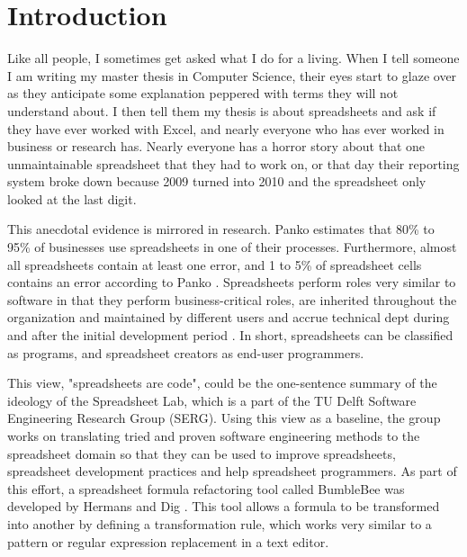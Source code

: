 \documentclass[12pt,a4paper,onecolumn,oneside,parskip]{memoir}
\begin{document}


\cleardoublepage

\tableofcontents*

\clearpage


\chapter{Introduction}

Like all people, I sometimes get asked what I do for a living.
When I tell someone I am writing my master thesis in Computer Science, their eyes start to glaze over as they anticipate some explanation peppered with terms they will not understand about.
I then tell them my thesis is about spreadsheets and ask if they have ever worked with Excel, and nearly everyone who has ever worked in business or research has.
Nearly everyone has a horror story about that one unmaintainable spreadsheet that they had to work on, or that day their reporting system broke down because 2009 turned into 2010 and the spreadsheet only looked at the last digit.

This anecdotal evidence is mirrored in research.
Panko \cite{panko2006facing} estimates that 80\% to 95\% of businesses use spreadsheets in one of their processes.
Furthermore, almost all spreadsheets contain at least one error, and 1 to 5\% of spreadsheet cells contains an error according to Panko \cite{panko1998we}.
Spreadsheets perform roles very similar to software in that they perform business-critical roles, are inherited throughout the organization and maintained by different users and accrue technical dept during and after the initial development period \cite{panko1998we}.
In short, spreadsheets can be classified as programs, and spreadsheet creators as end-user programmers.

This view, "spreadsheets are code", could be the one-sentence summary of the ideology of the Spreadsheet Lab, which is a part of the TU Delft Software Engineering Research Group (SERG).
Using this view as a baseline, the group works on translating tried and proven software engineering methods to the spreadsheet domain so that they can be used to improve spreadsheets, spreadsheet development practices and help spreadsheet programmers.
As part of this effort, a spreadsheet formula refactoring tool called BumbleBee was developed by Hermans and Dig \cite{hermans2014bumblebee}.
This tool allows a formula to be transformed into another by defining a transformation rule, which works very similar to a pattern or regular expression replacement in a text editor.
\end{document}
